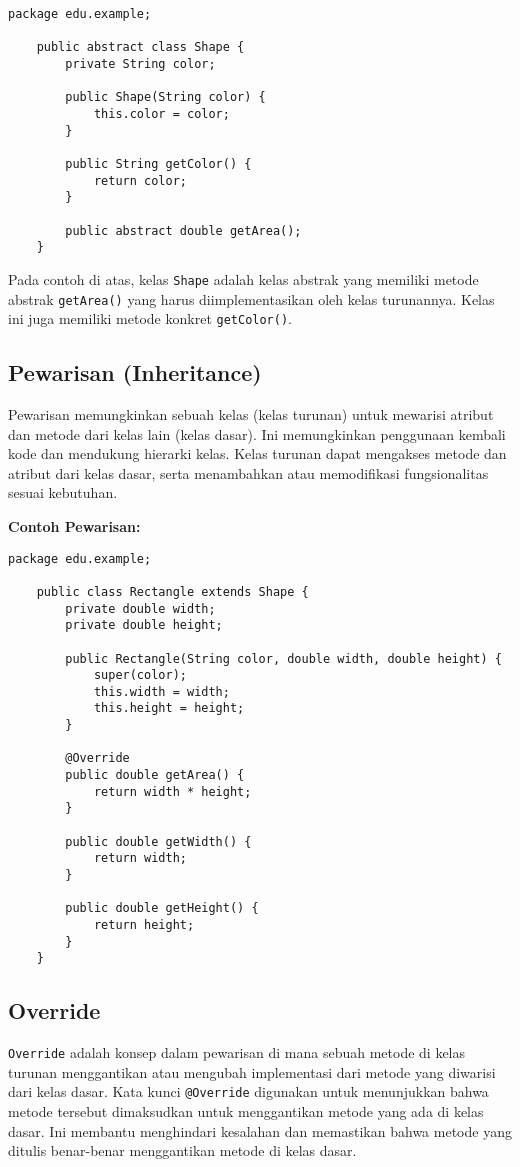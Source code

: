 \begin{lstlisting}[style=JavaStyle]
	package edu.example;
	
	public abstract class Shape {
		private String color;
		
		public Shape(String color) {
			this.color = color;
		}
		
		public String getColor() {
			return color;
		}
		
		public abstract double getArea();
	}
\end{lstlisting}

Pada contoh di atas, kelas \texttt{Shape} adalah kelas abstrak yang memiliki metode abstrak \texttt{getArea()} yang harus diimplementasikan oleh kelas turunannya. Kelas ini juga memiliki metode konkret \texttt{getColor()}.

\subsection{Pewarisan (Inheritance)}

Pewarisan memungkinkan sebuah kelas (kelas turunan) untuk mewarisi atribut dan metode dari kelas lain (kelas dasar). Ini memungkinkan penggunaan kembali kode dan mendukung hierarki kelas. Kelas turunan dapat mengakses metode dan atribut dari kelas dasar, serta menambahkan atau memodifikasi fungsionalitas sesuai kebutuhan.

\textbf{Contoh Pewarisan:}

\begin{lstlisting}[style=JavaStyle]
	package edu.example;
	
	public class Rectangle extends Shape {
		private double width;
		private double height;
		
		public Rectangle(String color, double width, double height) {
			super(color);
			this.width = width;
			this.height = height;
		}
		
		@Override
		public double getArea() {
			return width * height;
		}
		
		public double getWidth() {
			return width;
		}
		
		public double getHeight() {
			return height;
		}
	}
\end{lstlisting}

\subsection{Override}

\texttt{Override} adalah konsep dalam pewarisan di mana sebuah metode di kelas turunan menggantikan atau mengubah implementasi dari metode yang diwarisi dari kelas dasar. Kata kunci \texttt{@Override} digunakan untuk menunjukkan bahwa metode tersebut dimaksudkan untuk menggantikan metode yang ada di kelas dasar. Ini membantu menghindari kesalahan dan memastikan bahwa metode yang ditulis benar-benar menggantikan metode di kelas dasar.

